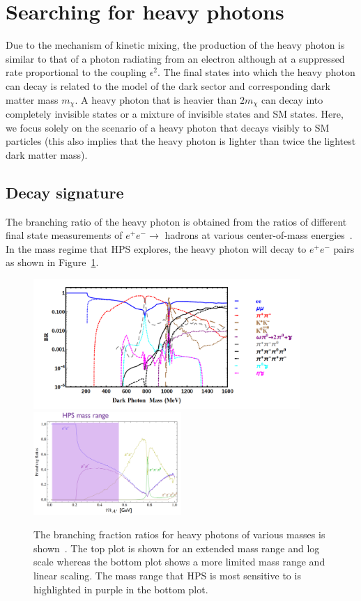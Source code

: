 \section{Searching for heavy photons}
Due to the mechanism of kinetic mixing, the production of the heavy photon is similar to that of a photon radiating from an electron although at a suppressed rate proportional to the coupling $\epsilon^2$. The final states into which the heavy photon can decay is related to the model of the dark sector and corresponding dark matter mass $m_{\chi}$. A heavy photon that is heavier than $2m_{\chi}$ can decay into completely invisible states or a mixture of invisible states and SM states. Here, we focus solely on the scenario of a heavy photon that decays visibly to SM particles (this also implies that the heavy photon is lighter than twice the lightest dark matter mass). 

\subsection{Decay signature}
The branching ratio of the heavy photon is obtained from the ratios of different final state measurements of $e^+e^-\rightarrow $ hadrons at various center-of-mass energies~\cite{liu_signals_2015}. In the mass regime that HPS explores, the heavy photon will decay to $e^+e^-$ pairs as shown in Figure~\ref{Figure:br}. 

\begin{figure}[htb]
  \centering
      \includegraphics[width=0.9\textwidth]{pics/motivation/branchingRatio.png}
 	 \includegraphics[width=0.5\textwidth]{pics/motivation/branchingLinear.png}	
  \caption[The branching fraction ratios for heavy photon decays]{The branching fraction ratios for heavy photons of various masses is shown~\cite{liu_signals_2015}. The top plot is shown for an extended mass range and log scale whereas the bottom plot shows a more limited mass range and linear scaling. The mass range that HPS is most sensitive to is highlighted in purple in the bottom plot.}
  \label{Figure:br}
\end{figure}

